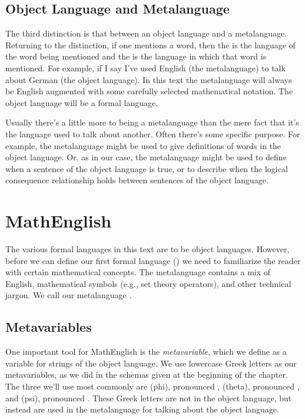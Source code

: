 \subsection{Object Language and Metalanguage}\label{objectandmetalanguage}
The third distinction is that between an object language and a metalanguage. 
Returning to the  distinction, if one mentions a word, then the  is the language of the word being mentioned and the  is the language in which that word is mentioned. 
For example, if I say  I've used English (the metalanguage) to talk about German (the object language). 
In this text the metalanguage will always be English augmented with some carefully selected mathematical notation. 
The object language will be a formal language. 

Usually there's a little more to being a metalanguage than the mere fact that it's the language used to talk about another. 
Often there's some specific purpose. 
For example, the metalanguage might be used to give definitions of words in the object language. Or, as in our case, the metalanguage might be used to define when a sentence of the object language is true, or to describe when the logical consequence relationship holds between sentences of the object language. 

\section{MathEnglish}\label{MathEnglish}

The various formal languages in this text are to be object languages.  However, before we can define our first formal language (\GSL{}) we need to familiarize the reader with certain mathematical concepts.  The metalanguage contains a mix of English, mathematical symbols (e.g., set theory operators), and other technical jargon.  We call our metalanguage .   

\subsection{Metavariables}\label{metavariables}
One important tool for MathEnglish is the \emph{metavariable}, which we define as a variable for strings of the object language.  
We use lowercase Greek letters as our metavariables, as we did in the schemas given at the beginning of the chapter.
The three we'll use most commonly are \mention{$\CAPPHI$} (phi), pronounced , \mention{$\CAPTHETA$} (theta), pronounced , and \mention{$\CAPPSI$} (psi), pronounced .
These Greek letters are not in the object language, but instead are used in the metalanguage for talking about the object language. 

